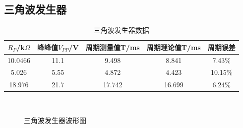 \documentclass[a4paper]{article}
\begin{document}
\newpage
\subsection{三角波发生器}%
\begin{table}[!h]
\centering
\caption{三角波发生器数据}
\label{data3}
\begin{tabular}{|c|c|c|c|c|}
\hline
$R_P$/k$\Omega$ & 峰峰值$V_{PP}$/V & 周期测量值T/ms & 周期理论值T/ms & 周期误差    \\ \hline
10.0466         & 11.1          & 9.498     & 8.841     & 7.43\%  \\ \hline
5.026           & 5.55          & 4.872     & 4.423     & 10.15\% \\ \hline
18.976          & 21.7          & 17.742    & 16.699    & 6.24\%  \\ \hline
\end{tabular}
\end{table}
\begin{figure}[!h]
\centering
{}\qquad
{}\qquad
{}\\
\caption{三角波发生器波形图}\label{datafig3}
\end{figure}
\end{document}
